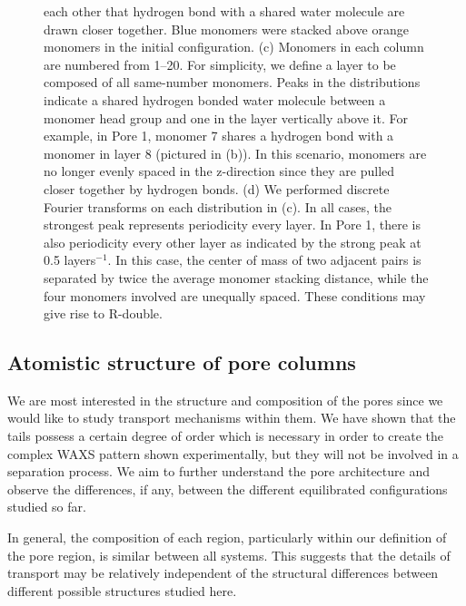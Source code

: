 \documentclass[journal=jpcbfk,manuscript=article]{achemso}
\begin{document}
\begin{figure}[!htb]
{  each other that hydrogen bond with a shared water molecule are drawn closer
  together. Blue monomers were stacked above orange monomers in the initial configuration.
  (c) Monomers in each column are numbered from 1--20. For simplicity, we define a layer to
  be composed of all same-number monomers. Peaks in the distributions indicate
  a shared hydrogen bonded water molecule between a monomer head group and one in the layer
  vertically above it. For example, in Pore 1, monomer 7 shares a hydrogen bond with
  a monomer in layer 8 (pictured in (b)). In this scenario, monomers are no longer evenly
  spaced in the z-direction since they are pulled closer together by hydrogen bonds. 
  (d) We performed discrete Fourier transforms on each distribution in (c). In all cases,
  the strongest peak represents periodicity every layer. In Pore 1, there is also periodicity
  every other layer as indicated by the strong peak at 0.5 layers$^{-1}$. In this case, the
  center of mass of two adjacent pairs is separated by twice the average monomer stacking 
  distance, while the four monomers involved are unequally spaced. These conditions may
  give rise to R-double.}\label{fig:hbonds}
  \end{figure}
  
  \subsection{Atomistic structure of pore columns}

  We are most interested in the structure and composition of the pores since we would like to study
  transport mechanisms within them. We have shown that the tails possess a certain degree of order
  which is necessary in order to create the complex WAXS pattern shown experimentally, but
  they will not be involved in a separation process. We aim to further understand the pore
  architecture and observe the differences, if any, between the different equilibrated
  configurations studied so far.

  In general, the composition of each region, particularly within our
  definition of the pore region, is similar between all systems.  This suggests
  that the details of transport may be relatively independent of the structural
  differences between different possible structures studied here.
  
\end{document}
